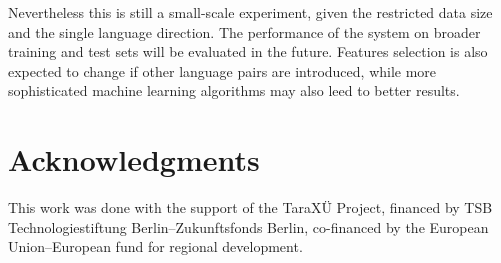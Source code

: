 \documentclass[11pt]{article}
\begin{document}
Nevertheless this is still a small-scale experiment, given the restricted data
size and the single language direction. The performance of the system on broader
training and test sets will be evaluated in the future. Features
selection is also expected to change if other language pairs are introduced,
while more sophisticated machine learning algorithms may also leed to better
results. 

\section*{Acknowledgments}
This work was done with the support of the TaraXÜ Project, financed by TSB 
Technologiestiftung Berlin--Zukunftsfonds Berlin, co-financed by the European 
Union--European fund for regional development.

 
 

%  
% 
% 
% 
% 
% 
\end{document}
